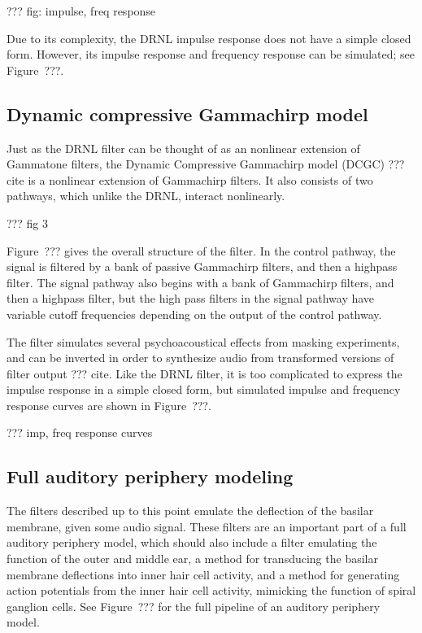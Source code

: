 ??? fig: impulse, freq response

Due to its complexity,
the DRNL impulse response does not have a simple closed form.
However, its impulse response
and frequency response can be simulated;
see Figure~???.

\subsection{Dynamic compressive Gammachirp model}

Just as the DRNL filter can be thought of
as an nonlinear extension of Gammatone filters,
the Dynamic Compressive Gammachirp model (DCGC)
??? cite
is a nonlinear extension of Gammachirp filters.
It also consists of two pathways,
which unlike the DRNL,
interact nonlinearly.

??? fig 3

Figure~??? gives the overall structure of the filter.
In the control pathway,
the signal is filtered by
a bank of passive Gammachirp filters,
and then a highpass filter.
The signal pathway
also begins with a bank of Gammachirp filters,
and then a highpass filter,
but the high pass filters in the signal pathway
have variable cutoff frequencies
depending on the output of the control pathway.

The filter simulates
several psychoacoustical effects
from masking experiments,
and can be inverted in order to
synthesize audio
from transformed versions
of filter output
??? cite.
Like the DRNL filter, it is too complicated
to express the impulse response
in a simple closed form,
but simulated impulse and frequency response
curves are shown in Figure~???.

??? imp, freq response curves

\subsection{Full auditory periphery modeling}

The filters described up to this point
emulate the deflection
of the basilar membrane,
given some audio signal.
These filters are an important part
of a full auditory periphery model,
which should also include
a filter emulating the function
of the outer and middle ear,
a method for transducing
the basilar membrane deflections
into inner hair cell activity,
and a method for generating
action potentials from the inner hair cell activity,
mimicking the function of spiral ganglion cells.
See Figure~??? for the full pipeline
of an auditory periphery model.

